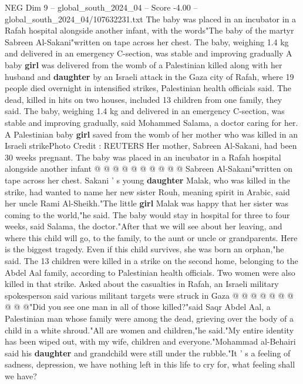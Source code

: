\begin{textsample}{NEG Dim 9 – global\_south\_2024\_04 – Score -4.00 – global\_south\_2024\_04/107632231.txt}  \label{ex:f9_neg_327}
The baby was placed in an incubator in a Rafah hospital alongside another infant, with the words"The baby of the martyr Sabreen Al-Sakani"written on tape across her chest.
The baby, weighing 1.4 kg and delivered in an emergency C-section, was stable and improving gradually A baby \textbf{girl} was delivered from the womb of a Palestinian killed along with her husband and \textbf{daughter} by an Israeli attack in the Gaza city of Rafah, where 19 people died overnight in intensified strikes, Palestinian health officials said.
The dead, killed in hits on two houses, included 13 children from one family, they said.
The baby, weighing 1.4 kg and delivered in an emergency C-section, was stable and improving gradually, said Mohammed Salama, a doctor caring for her.
A Palestinian baby \textbf{girl} saved from the womb of her mother who was killed in an Israeli strikePhoto Credit : REUTERS Her mother, Sabreen Al-Sakani, had been 30 weeks pregnant.
The baby was placed in an incubator in a Rafah hospital alongside another infant @ @ @ @ @ @ @ @ @ @ Sabreen Al-Sakani"written on tape across her chest.
Sakani ' s young \textbf{daughter} Malak, who was killed in the strike, had wanted to name her new sister Rouh, meaning spirit in Arabic, said her uncle Rami Al-Sheikh."The little \textbf{girl} Malak was happy that her sister was coming to the world,"he said.
The baby would stay in hospital for three to four weeks, said Salama, the doctor."After that we will see about her leaving, and where this child will go, to the family, to the aunt or uncle or grandparents.
Here is the biggest tragedy.
Even if this child survives, she was born an orphan,"he said.
The 13 children were killed in a strike on the second home, belonging to the Abdel Aal family, according to Palestinian health officials.
Two women were also killed in that strike.
Asked about the casualties in Rafah, an Israeli military spokesperson said various militant targets were struck in Gaza @ @ @ @ @ @ @ @ @ @"Did you see one man in all of those killed?"said Saqr Abdel Aal, a Palestinian man whose family were among the dead, grieving over the body of a child in a white shroud."All are women and children,"he said."My entire identity has been wiped out, with my wife, children and everyone."Mohammad al-Behairi said his \textbf{daughter} and grandchild were still under the rubble."It ' s a feeling of sadness, depression, we have nothing left in this life to cry for, what feeling shall we have?

\end{textsample}
